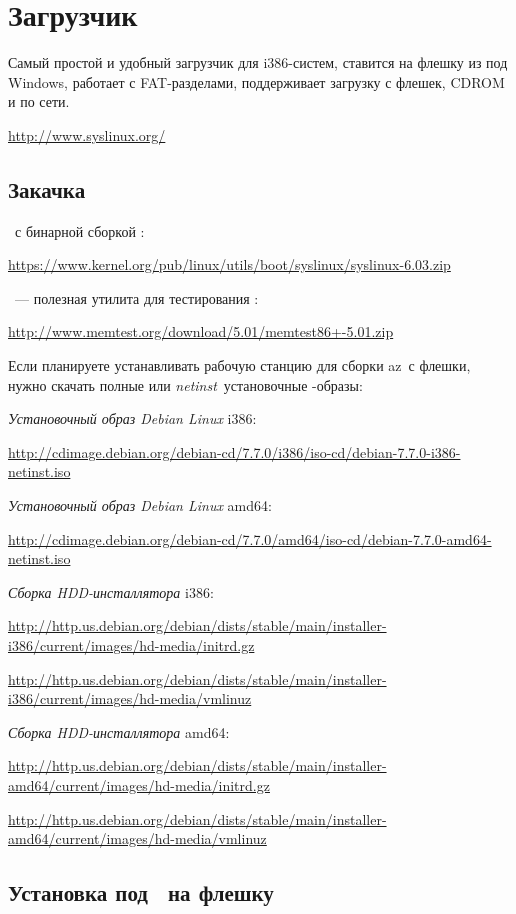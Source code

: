 \section{Загрузчик }

Самый простой и удобный загрузчик для i386-систем, ставится на флешку
из под Windows, работает с FAT-разделами, поддерживает загрузку с флешек, CDROM
и по сети.

\bigskip
\url{http://www.syslinux.org/}

\subsection{Закачка}

\ с бинарной сборкой :

\url{https://www.kernel.org/pub/linux/utils/boot/syslinux/syslinux-6.03.zip}
\bigskip

\ --- полезная утилита для тестирования \ram:

\url{http://www.memtest.org/download/5.01/memtest86+-5.01.zip}
\bigskip 

Если планируете устанавливать рабочую станцию для сборки az\linux\ с флешки,
нужно скачать полные или \emph{netinst}\ установочные -образы: 

\emph{Установочный образ Debian Linux} i386:

\url{http://cdimage.debian.org/debian-cd/7.7.0/i386/iso-cd/debian-7.7.0-i386-netinst.iso}

\emph{Установочный образ Debian Linux} amd64:

\url{http://cdimage.debian.org/debian-cd/7.7.0/amd64/iso-cd/debian-7.7.0-amd64-netinst.iso}

\emph{Сборка HDD-инсталлятора} i386:

\url{http://http.us.debian.org/debian/dists/stable/main/installer-i386/current/images/hd-media/initrd.gz}

\url{http://http.us.debian.org/debian/dists/stable/main/installer-i386/current/images/hd-media/vmlinuz}

\emph{Сборка HDD-инсталлятора} amd64:

\url{http://http.us.debian.org/debian/dists/stable/main/installer-amd64/current/images/hd-media/initrd.gz}

\url{http://http.us.debian.org/debian/dists/stable/main/installer-amd64/current/images/hd-media/vmlinuz}

\subsection{Установка под \win\ на флешку}

